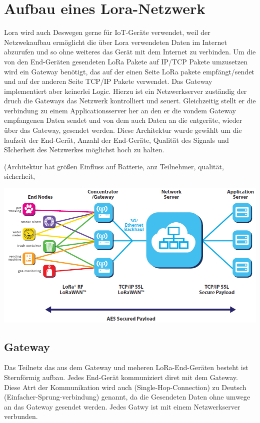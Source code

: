 \documentclass[a4paper,12pt]{article}
\begin{document}
    \section{Aufbau eines Lora-Netzwerk}
        Lora wird auch Deswegen gerne für IoT-Geräte verwendet, weil der Netzwekaufbau ermöglicht die über Lora verwendeten Daten im Internet abzurufen und so ohne weiteres das Gerät mit dem Internet zu verbinden. Um die von den End-Geräten gesendeten LoRa Pakete auf IP/TCP Pakete umzusetzen wird ein Gateway benötigt, das auf der einen Seite LoRa pakete empfängt/sendet und auf der anderen Seite TCP/IP Pakete verwendet.
        Das Gateway implementiert aber keinerlei Logic. Hierzu ist ein Netzwerkserver zuständig der druch die Gateways das Netzwerk kontrolliert und seuert. Gleichzeitig stellt er die verbindung zu einem Applicationsserver her an den er die vondem Gateway empfangenen Daten sendet und von dem auch Daten an die entgeräte, wieder über das Gateway, gesendet werden.
        Diese Architektur wurde gewählt um die laufzeit der End-Gerät, Anzahl der End-Geräte, Qualität des Signals und SIcherheit des Netzwerkes möglichst hoch zu halten.


        \cite{WhatIsLoRa}(Architektur hat größen Einfluss auf Batterie, anz Teilnehmer, qualität, sicherheit,


        \includegraphics[width=\textwidth]{Netzwerkaufbau}
        
        \subsection{Gateway}
            Das Teilnetz das aus dem Gateway und meheren LoRa-End-Geräten besteht ist Sternförmig aufbau. Jedes End-Gerät kommuniziert diret mit dem Gateway. Diese Atrt der Kommunikation wird auch (Single-Hop-Connection) zu Deutsch (Einfacher-Sprung-verbindung) genannt, da die Gesendeten Daten ohne umwege an das Gateway gesendet werden. Jedes Gatwy ist mit einem Netzwerkserver verbunden.
\end{document}
